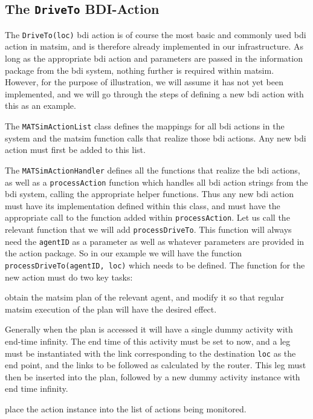 \subsection{The \lstinline{DriveTo} BDI-Action}
The \lstinline{DriveTo(loc)} \gls{bdi} action is of course the most basic and
commonly used \gls{bdi} action in \gls{matsim}, and is therefore already
implemented in our infrastructure. As long as the appropriate \gls{bdi}
action and parameters are passed in the information package from the
\gls{bdi} system, nothing further is required within \gls{matsim}. However, for
the purpose of illustration, we will assume it has not yet been
implemented, and we will go through the steps of defining a new \gls{bdi}
action with this as an example.

The \lstinline{MATSimActionList} class defines the mappings for all \gls{bdi}
actions in the system and the \gls{matsim} function calls that realize those
\gls{bdi} actions.  Any new \gls{bdi} action must first be added to this list.

The \lstinline{MATSimActionHandler} defines all the functions that
realize the \gls{bdi} actions, as well as a \lstinline{processAction} function
which handles all \gls{bdi} action strings from the \gls{bdi} system,
calling the appropriate helper functions. Thus any new \gls{bdi} action must have
its implementation defined within this class, and must have the appropriate
call to the function added within \lstinline{processAction}.  Let us call
the relevant function that we will add \lstinline{processDriveTo}. This function
will always need the \lstinline{agentID} as a parameter as well as
whatever parameters are provided in the action package. So in our
example we will have the function \lstinline{processDriveTo(agentID, loc)}
which needs to be defined. 
%
The function for the new action must do two key tasks:
\begin{tightenumerate}
\item obtain the \gls{matsim} plan of the relevant agent, and modify it so
  that regular \gls{matsim} execution of the plan will have the desired
  effect.

Generally when the plan is accessed it will have a single dummy
activity with end-time infinity. The end time of this activity must be
set to now, and a leg must be instantiated with the link corresponding
to the destination \lstinline{loc} as the end point, and the links to be
followed as calculated by the router. This leg must then be inserted
into the plan, followed by a new dummy activity instance with end time
infinity. 

\item place the action instance into the list of actions being
  monitored. 
\end{tightenumerate}

